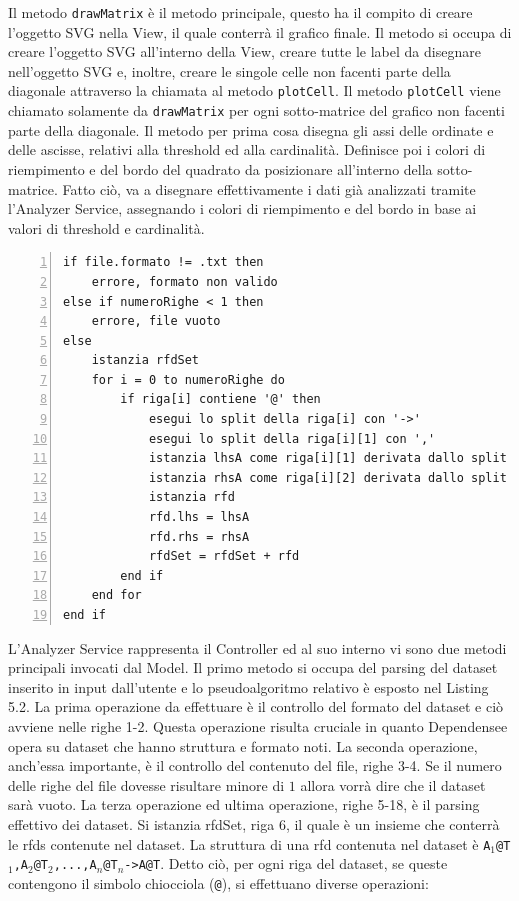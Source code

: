 Il metodo \texttt{drawMatrix} \`{e} il metodo principale, questo ha il compito di creare l'oggetto SVG nella View, il quale conterr\`{a} il grafico finale. Il metodo si occupa di creare l'oggetto SVG all'interno della View, creare tutte le label da disegnare nell'oggetto SVG e, inoltre, creare le singole celle non facenti parte della diagonale attraverso la chiamata al metodo \texttt{plotCell}. Il metodo \texttt{plotCell} viene chiamato solamente da \texttt{drawMatrix} per ogni sotto-matrice del grafico non facenti parte della diagonale. Il metodo per prima cosa disegna gli assi delle ordinate e delle ascisse, relativi alla threshold ed alla cardinalit\`{a}. Definisce poi i colori di riempimento e del bordo del quadrato da posizionare all'interno della sotto-matrice. Fatto ci\`{o}, va a disegnare effettivamente i dati gi\`{a} analizzati tramite l'Analyzer Service, assegnando i colori di riempimento e del bordo in base ai valori di threshold e cardinalit\`{a}.\par
\begin{lstlisting}[numbers=left, xleftmargin=3em, captionpos=b, caption={Pseudocodice del metodo per il parsing dei dataset.}, label=analyzeFile_pseudo, frame=lines, breaklines=true, morekeywords={if, then, else, end, to, do, for}]
if file.formato != .txt then
    errore, formato non valido
else if numeroRighe < 1 then
    errore, file vuoto
else
    istanzia rfdSet
    for i = 0 to numeroRighe do
        if riga[i] contiene '@' then
            esegui lo split della riga[i] con '->'
            esegui lo split della riga[i][1] con ','
            istanzia lhsA come riga[i][1] derivata dallo split con '@'
            istanzia rhsA come riga[i][2] derivata dallo split con '@'
            istanzia rfd
            rfd.lhs = lhsA
            rfd.rhs = rhsA
            rfdSet = rfdSet + rfd
        end if
    end for
end if
\end{lstlisting}
L'Analyzer Service rappresenta il Controller ed al suo interno vi sono due metodi principali invocati dal Model.
Il primo metodo si occupa del parsing del dataset inserito in input dall'utente e lo pseudoalgoritmo relativo \`{e} esposto nel Listing 5.2. La prima operazione da effettuare \`{e} il controllo del formato del dataset e ci\`{o} avviene nelle righe 1-2. Questa operazione risulta cruciale in quanto Dependensee opera su dataset che hanno struttura e formato noti. La seconda operazione, anch'essa importante, \`{e} il controllo del contenuto del file, righe 3-4. Se il numero delle righe del file dovesse risultare minore di $1$ allora vorr\`{a} dire che il dataset sar\`{a} vuoto. La terza operazione ed ultima operazione, righe 5-18, \`{e} il parsing effettivo dei dataset. Si istanzia rfdSet, riga 6, il quale \`{e} un insieme che conterr\`{a} le \acrshort{rfds} contenute nel dataset. La struttura di una \acrshort{rfd} contenuta nel dataset \`{e} \texttt{A$_1$@T$_1$,A$_2$@T$_2$,...,A$_n$@T$_n$->A@T}. Detto ci\`{o}, per ogni riga del dataset, se queste contengono il simbolo chiocciola (\texttt{@}), si effettuano diverse operazioni:

